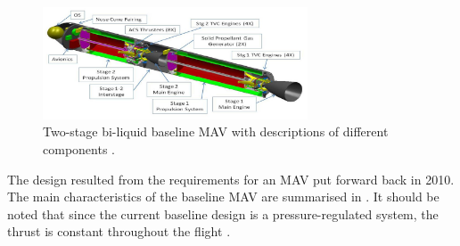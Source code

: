 \begin{figure}[!ht]
\centering
\includegraphics[width=0.7\textwidth]{figures/heritage/baseline_mav_trinidad2012.jpg}
\caption{Two-stage bi-liquid baseline \ac{MAV} with descriptions of different components \cite{trinidad2012}.}
\label{fig:baseline_mav_trinidad2012}
\end{figure}



The design resulted from the requirements for an \ac{MAV} put forward back in 2010. The main characteristics of the baseline \ac{MAV} are summarised in . It should be noted that since the current baseline design is a pressure-regulated system, the thrust is constant throughout the flight \cite{colozza2003comparison}.


